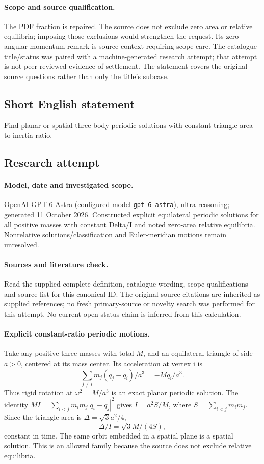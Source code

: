 \documentclass[11pt]{article}
\begin{document}
\paragraph{Scope and source qualification.}The PDF fraction is repaired. The source does not exclude zero area or relative equilibria; imposing those exclusions would strengthen the request. Its zero-angular-momentum remark is source context requiring scope care. The catalogue title/status was paired with a machine-generated research attempt; that attempt is not peer-reviewed evidence of settlement. The statement covers the original source questions rather than only the title’s subcase.
\subsection{Short English statement}
Find planar or spatial three-body periodic solutions with constant triangle-area-to-inertia ratio.
\subsection{Research attempt}
\paragraph{Model, date and investigated scope.}
OpenAI GPT-6 Astra (configured model \texttt{gpt-6-astra}), ultra reasoning; generated 11 October 2026. Constructed explicit equilateral periodic solutions for all positive masses with constant Delta/I and noted zero-area relative equilibria. Nonrelative solutions/classification and Euler-meridian motions remain unresolved.

\paragraph{Sources and literature check.}
Read the supplied complete definition, catalogue wording, scope qualifications and source list for this canonical ID. The original-source citations are inherited as supplied references; no fresh primary-source or novelty search was performed for this attempt. No current open-status claim is inferred from this calculation.

\paragraph{Explicit constant-ratio periodic motions.}Take any positive three masses with total \(M\), and an equilateral triangle of side \(a>0\), centered at its mass center. Its acceleration at vertex i is
\[\sum_{j\ne i}m_j(q_j-q_i)/a^3=-Mq_i/a^3.
\]
Thus rigid rotation at \(\omega^2=M/a^3\) is an exact planar periodic solution. The identity \(MI=\sum_{i<j}m_im_j|q_i-q_j|^2\) gives \(I=a^2S/M\), where \(S=\sum_{i<j}m_im_j\). Since the triangle area is \(\Delta=\sqrt3a^2/4\),
\[\Delta/I=\sqrt3 M/(4S),
\]
constant in time. The same orbit embedded in a spatial plane is a spatial solution. This is an allowed family because the source does not exclude relative equilibria.
\end{document}
